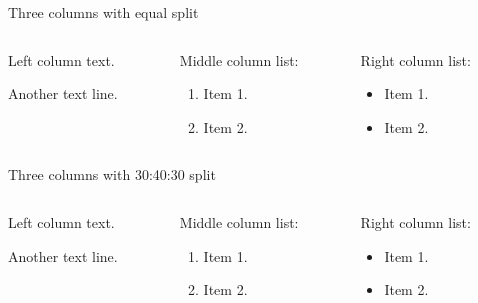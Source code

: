 \documentclass[
  11pt,
  ignorenonframetext,
  aspectratio=169,
  aspectratio=169]{beamer}
\providecommand{\tightlist}{%
  \setlength{\itemsep}{0pt}\setlength{\parskip}{0pt}}
\begin{document}
\begin{frame}{Three columns with equal split}
\protect\hypertarget{three-columns-with-equal-split}{}
\begin{columns}[T]
\begin{column}{0.48\textwidth}
Left column text.

Another text line.
\end{column}

\begin{column}{0.48\textwidth}
Middle column list:

\begin{enumerate}
\tightlist
\item
  Item 1.
\item
  Item 2.
\end{enumerate}
\end{column}

\begin{column}{0.48\textwidth}
Right column list:

\begin{itemize}
\tightlist
\item
  Item 1.
\item
  Item 2.
\end{itemize}
\end{column}
\end{columns}
\end{frame}

\begin{frame}{Three columns with 30:40:30 split}
\protect\hypertarget{three-columns-with-304030-split}{}
\begin{columns}[T]
\begin{column}{0.3\textwidth}
Left column text.

Another text line.
\end{column}

\begin{column}{0.4\textwidth}
Middle column list:

\begin{enumerate}
\tightlist
\item
  Item 1.
\item
  Item 2.
\end{enumerate}
\end{column}

\begin{column}{0.3\textwidth}
Right column list:

\begin{itemize}
\tightlist
\item
  Item 1.
\item
  Item 2.
\end{itemize}
\end{column}
\end{columns}
\end{frame}
\end{document}
